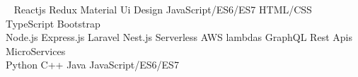 \documentclass[draft=false]{deedy-resume-openfont}
\begin{document}
\begin{minipage}[t]{0.39\textwidth}
\vspace{0.2cm}\
\vspace{0.3cm}
\textbullet{}Reactjs{} {} {} {} {} {} {} {} {} {} {} {} {} {} \textbullet{}Redux{} {} {} {} {} {} {} {} {} {} {} {} {} {}
\vspace{0.3cm}\textbullet{}Material Ui Design{} {} {} {} {} {} {} {} {} {} {} {} {} {}
\textbullet{}JavaScript/ES6/ES7{} {} {} {} {} {} {} {} {} {} {} {} {} {} {} {} {} \vspace{0.3cm}\textbullet{}HTML/CSS \textbullet{}TypeScript{} {} {} {} {} {} {} {} {} {} {} {} {} {} {} {} {} {} {} {} {} {} {} {} {} {} {} {} {} {} {} {} {} {} {} {} {} {} \textbullet{}Bootstrap\\
\vspace{0.4cm}
\vspace{0.3cm}
\textbullet{}Node.js{} {} {} {} {} {} {} {} {} {} {} {} {} {} \textbullet{}Express.js{} {} {} {} {} {} {} {} {} {} {} {} 
\vspace{0.3cm}\textbullet{}Laravel{} {} {} {} {} {} {} {} {} {} {} {} {} {}
\textbullet{}Nest.js{} {} {} {} {} {} {} {} {} {} {} {} {} {} {} {} {}\vspace{0.3cm}
\textbullet{}Serverless{} {} {} {} {} {} {} {} {} {}  \textbullet{}AWS lambdas{} {} {} {} {} {} {} {} {} {} {} \textbullet{}GraphQL{} {} {} {} {} {} {} {} {} {} {}  \vspace{0.3cm}\textbullet{}Rest Apis{} {} {} {} {} {} {} {} {} {} {} {}
 \textbullet{}MicroServices\\
 \vspace{0.4cm}
 \vspace{0.3cm}
 \textbullet{}Python{}{} {} {} {} {} {} {} {} {} {} {} {} {} 
 {} {} {}  {} {} {} {} {} {} {} {} {} {} {} {}\vspace{0.3cm}\textbullet{}C++{} {} {} {} {} {} {} {} {} {} {} {} {} {}
 \textbullet{}Java{} {} {} {} {} {} {} {} {} {} {} {} {} {}\textbullet{}JavaScript/ES6/ES7\\
 \vspace{0.4cm}
\vspace{0.4cm}

\end{minipage}
\end{document}
